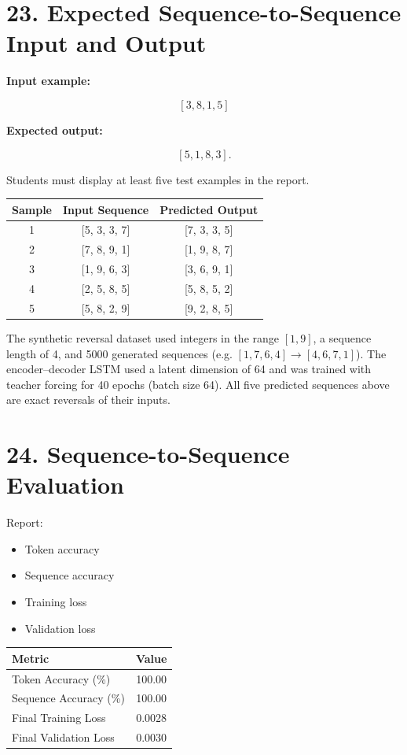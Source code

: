 \documentclass[10pt]{article}
\begin{document}
\section*{23. Expected Sequence-to-Sequence Input and Output}

\textbf{Input example:}

\[
[3,8,1,5]
\]

\textbf{Expected output:}

\[
[5,1,8,3].
\]

Students must display at least five test examples in the report.

\begin{center}
\begin{tabular}{|c|c|c|}
\hline
Sample & Input Sequence & Predicted Output\\
\hline
1 & [5, 3, 3, 7] & [7, 3, 3, 5]\\
2 & [7, 8, 9, 1] & [1, 9, 8, 7]\\
3 & [1, 9, 6, 3] & [3, 6, 9, 1]\\
4 & [2, 5, 8, 5] & [5, 8, 5, 2]\\
5 & [5, 8, 2, 9] & [9, 2, 8, 5]\\
\hline
\end{tabular}
\end{center}

The synthetic reversal dataset used integers in the range $[1,9]$, a
sequence length of 4, and 5000 generated sequences (e.g.
$[1,7,6,4]\rightarrow[4,6,7,1]$). The encoder--decoder LSTM used a latent
dimension of 64 and was trained with teacher forcing for 40 epochs
(batch size 64). All five predicted sequences above are exact reversals of
their inputs.

\section*{24. Sequence-to-Sequence Evaluation}

Report:

\begin{itemize}
\item Token accuracy
\item Sequence accuracy
\item Training loss
\item Validation loss
\end{itemize}

\begin{center}
\begin{tabular}{|l|c|}
\hline
Metric & Value\\
\hline
Token Accuracy (\%) & 100.00\\
Sequence Accuracy (\%) & 100.00\\
Final Training Loss & 0.0028\\
Final Validation Loss & 0.0030\\
\hline
\end{tabular}
\end{center}
\end{document}
